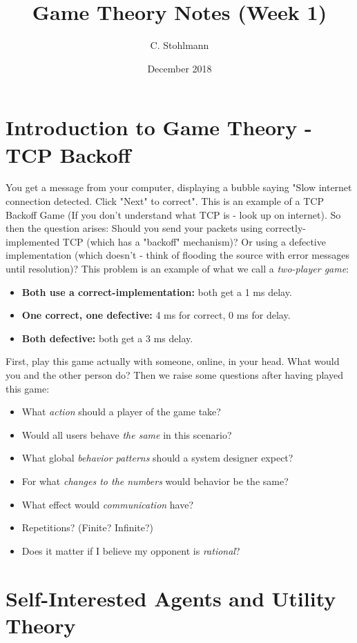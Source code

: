 \documentclass{article}
\title{Game Theory Notes (Week 1)}
\author{C. Stohlmann}
\date{December 2018}
\begin{document}
\maketitle

\section{Introduction to Game Theory - TCP Backoff}

You get a message from your computer, displaying a bubble saying "Slow internet connection detected. Click "Next" to correct". This is an example of a TCP Backoff Game (If you don't understand what TCP is - look up on internet). So then the question arises: Should you send your packets using correctly-implemented TCP (which has a "backoff" mechanism)? Or using a defective implementation (which doesn't - think of flooding the source with error messages until resolution)? 
\vskip 0.1in
This problem is an example of what we call a \emph{two-player game}:
\begin{itemize}
    \item \textbf{Both use a correct-implementation:} both get a 1 ms delay.
    \item \textbf{One correct, one defective:} 4 ms for correct, 0 ms for delay.
    \item \textbf{Both defective:} both get a 3 ms delay.
\end{itemize}
\vskip 0.1in
First, play this game actually with someone, online, in your head. What would you and the other person do? Then we raise some questions after having played this game:
\begin{itemize}
    \item What \emph{action} should a player of the game take?
    \item Would all users behave \emph{the same} in this scenario?
    \item What global \emph{behavior patterns} should a system designer expect?
    \item For what \emph{changes to the numbers} would behavior be the same?
    \item What effect would \emph{communication} have?
    \item Repetitions? (Finite? Infinite?)
    \item Does it matter if I believe my opponent is \emph{rational}?
\end{itemize}

\section{Self-Interested Agents and Utility Theory}
\end{document}
